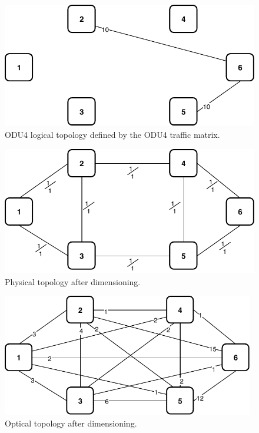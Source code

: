 \begin{figure}[h!]
\centering
\includegraphics[width=12cm]{sdf/ilp/transparent_survivability/figures/logical_topology_ODU4_medium}
\caption{ODU4 logical topology defined by the ODU4 traffic matrix.}
\label{logical2_ODU4_medium}
\end{figure}

\begin{figure}[h!]
\centering
\includegraphics[width=12cm]{sdf/ilp/transparent_survivability/figures/physical_topology}
\caption{Physical topology after dimensioning.}
\label{physical2_medium}
\end{figure}
\newpage
\begin{figure}[h!]
\centering
\includegraphics[width=11cm]{sdf/ilp/transparent_survivability/figures/optical_topology_medium}
\caption{Optical topology after dimensioning.}
\label{optical2_medium}
\end{figure}

